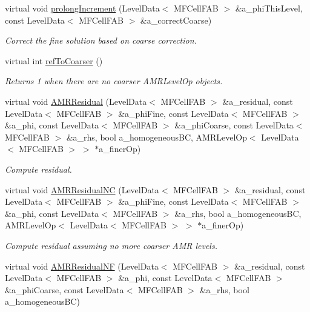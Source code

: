 \begin{DoxyCompactItemize}
virtual void \hyperlink{classmfconductivityop_abc1afb73b2bd3800f8ed23464253dc61}{prolong\+Increment} (Level\+Data$<$ M\+F\+Cell\+F\+AB $>$ \&a\+\_\+phi\+This\+Level, const Level\+Data$<$ M\+F\+Cell\+F\+AB $>$ \&a\+\_\+correct\+Coarse)
\begin{DoxyCompactList}\small\item\em Correct the fine solution based on coarse correction. \end{DoxyCompactList}\item 
virtual int \hyperlink{classmfconductivityop_a48f799b5f9be80928915057065404c02}{ref\+To\+Coarser} ()
\begin{DoxyCompactList}\small\item\em Returns 1 when there are no coarser A\+M\+R\+Level\+Op objects. \end{DoxyCompactList}\item 
virtual void \hyperlink{classmfconductivityop_a8596fde67dcfb39bc5695652ae9a4aa5}{A\+M\+R\+Residual} (Level\+Data$<$ M\+F\+Cell\+F\+AB $>$ \&a\+\_\+residual, const Level\+Data$<$ M\+F\+Cell\+F\+AB $>$ \&a\+\_\+phi\+Fine, const Level\+Data$<$ M\+F\+Cell\+F\+AB $>$ \&a\+\_\+phi, const Level\+Data$<$ M\+F\+Cell\+F\+AB $>$ \&a\+\_\+phi\+Coarse, const Level\+Data$<$ M\+F\+Cell\+F\+AB $>$ \&a\+\_\+rhs, bool a\+\_\+homogeneous\+BC, A\+M\+R\+Level\+Op$<$ Level\+Data$<$ M\+F\+Cell\+F\+AB $>$ $>$ $\ast$a\+\_\+finer\+Op)
\begin{DoxyCompactList}\small\item\em Compute residual. \end{DoxyCompactList}\item 
virtual void \hyperlink{classmfconductivityop_aaa8c483838f12997519f0634a84076d7}{A\+M\+R\+Residual\+NC} (Level\+Data$<$ M\+F\+Cell\+F\+AB $>$ \&a\+\_\+residual, const Level\+Data$<$ M\+F\+Cell\+F\+AB $>$ \&a\+\_\+phi\+Fine, const Level\+Data$<$ M\+F\+Cell\+F\+AB $>$ \&a\+\_\+phi, const Level\+Data$<$ M\+F\+Cell\+F\+AB $>$ \&a\+\_\+rhs, bool a\+\_\+homogeneous\+BC, A\+M\+R\+Level\+Op$<$ Level\+Data$<$ M\+F\+Cell\+F\+AB $>$ $>$ $\ast$a\+\_\+finer\+Op)
\begin{DoxyCompactList}\small\item\em Compute residual assuming no more coarser A\+MR levels. \end{DoxyCompactList}\item 
virtual void \hyperlink{classmfconductivityop_a7d309b212517b761936385036052ccb7}{A\+M\+R\+Residual\+NF} (Level\+Data$<$ M\+F\+Cell\+F\+AB $>$ \&a\+\_\+residual, const Level\+Data$<$ M\+F\+Cell\+F\+AB $>$ \&a\+\_\+phi, const Level\+Data$<$ M\+F\+Cell\+F\+AB $>$ \&a\+\_\+phi\+Coarse, const Level\+Data$<$ M\+F\+Cell\+F\+AB $>$ \&a\+\_\+rhs, bool a\+\_\+homogeneous\+BC)

\end{DoxyCompactItemize}
